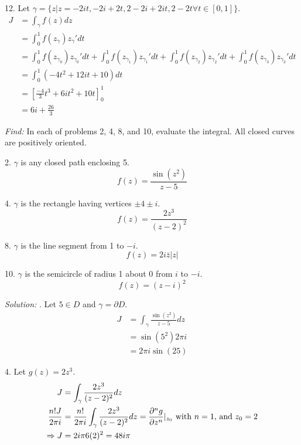 \documentclass[11pt]{homework}
\begin{document}
12. Let $\gamma = \{ z | z=-2it,-2i+2t,2-2i+2it,2-2t \forall t\in[0,1]\}$.
\begin{align*}
  J &= \int_\gamma f(z) dz \\
    &= \int_0^1 f(z_\gamma) z_\gamma' dt  \\
    &= \int_0^1 f(z_{\gamma_0}) z_{\gamma_0}' dt  + \int_0^1 f(z_{\gamma_1}) z_{\gamma_1}' dt  +
         \int_0^1 f(z_{\gamma_2}) z_{\gamma_2}' dt  + \int_0^1 f(z_{\gamma_3}) z_{\gamma_3}' dt \\
    &= \int_0^1 (-4t^2 +12it+10) dt \\
    &= \left[ \frac{-4}{3} t^3 +6i t^2 +10t\right]_0^1 \\
    &= 6i + \frac{26}{3}
\end{align*}

\newpage
{}
\emph{Find:}
\newline
In each of problems 2, 4, 8, and 10,
evaluate the integral.
All closed curves are positively oriented.

2. $\gamma$ is any closed path enclosing 5.
\begin{equation*}
  f(z) = \frac{\sin(z^2)}{z-5}
\end{equation*}

4. $\gamma$ is the rectangle having vertices $\pm4\pm i$.
\begin{equation*}
  f(z) = \frac{2z^3}{(z-2)^2}
\end{equation*}

8. $\gamma$ is the line segment from 1 to $-i$.
\begin{equation*}
f(z) = 2i\bar{z}|z|
\end{equation*}

10. $\gamma$ is the semicircle of radius 1 about 0 from $i$ to $-i$.
\begin{equation*}
f(z) = (z-i)^2
\end{equation*}

\emph{Solution:}
. Let $5\in D$ and $\gamma = \partial D$.
\begin{align*}
J &= \int_\gamma \frac{ \sin(z^2)}{z-5} dz \\
  &= \sin( 5^2) 2 \pi i \\
  &= 2 \pi i \sin( 25)
\end{align*}

4. Let $g(z) = 2z^3$.
\begin{align*}
J &= \int_\gamma \frac{ 2z^3}{(z-2)^2} dz \\
\frac{ n! J}{2 \pi i} &=\frac{n!}{2 \pi i} \int_\gamma \frac{ 2z^3}{(z-2)^2} dz = \pdv[n]{g}{z}|_{z_0} \text{ with $n=1$, and $z_0 = 2$} \\
\Rightarrow 
  J &=  2 i \pi  6 (2)^2 = 48 i \pi
\end{align*}
\end{document}
